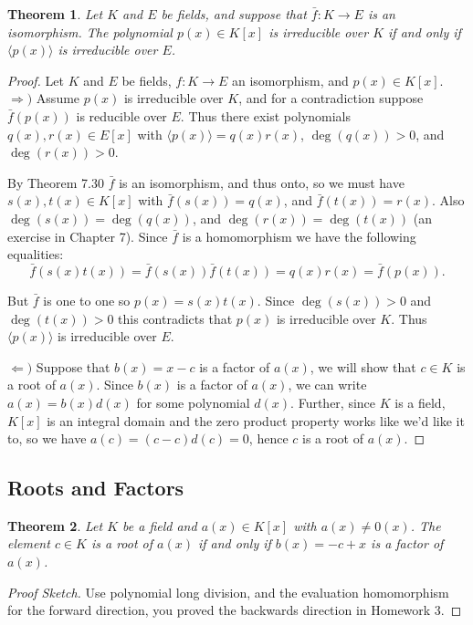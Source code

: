 \documentclass[letterpaper, 12pt]{article}
\newcommand{\pid}[1]{\langle #1 \rangle}
\newtheorem{thm}{Theorem}
\begin{document}
			\setcounter{thm}{13}
			\begin{thm}
			Let $K$ and $E$ be fields, and suppose that $\bar{f} : K \to E$ is an \textit{isomorphism}. 
			The polynomial $p(x) \in K[x]$ is irreducible over $K$ if and only if $\pid{p(x)}$ is irreducible over $E$.
			\end{thm}
			\color{ForestGreen}
			\begin{proof}
			Let $K$ and $E$ be fields, $f : K \to E$ an isomorphism, and $p(x) \in K[x]$.
			$\Rightarrow)$ Assume $p(x)$ is irreducible over $K$, and for a contradiction suppose $\bar{f}(p(x))$ is reducible over $E$. 
			Thus there exist polynomials $q(x),r(x) \in E[x]$ with $\pid{p(x)} = q(x)r(x)$, $\deg(q(x)) > 0$, and $\deg(r(x)) > 0$.

			By Theorem 7.30 $\bar{f}$ is an isomorphism, and thus onto, so we must have $s(x), t(x) \in K[x]$ with $\bar{f}(s(x)) = q(x)$, and $\bar{f}(t(x)) = r(x)$. 
			Also $\deg(s(x)) = \deg(q(x))$, and $\deg(r(x)) = \deg(t(x))$ (an exercise in Chapter 7). 
			Since $\bar{f}$ is a homomorphism we have the following equalities:$$\bar{f}(s(x)t(x)) = \bar{f}(s(x))\bar{f}(t(x)) = q(x)r(x) = \bar{f}(p(x)).$$

			But $\bar{f}$ is one to one so $p(x) = s(x)t(x)$. 
			Since $\deg(s(x)) > 0$ and $\deg(t(x)) > 0$ this contradicts that $p(x)$ is irreducible over $K$. Thus $\pid{p(x)}$ is irreducible over $E$.

			\color{blue}
			$\Leftarrow)$ Suppose that $b(x) = x - c$ is a factor of $a(x)$, we will show that $c \in K$ is a root of $a(x)$.
			Since $b(x)$ is a factor of $a(x)$, we can write $a(x) = b(x)d(x)$ for some polynomial $d(x)$.
			Further, since $K$ is a field, $K[x]$ is an integral domain and the zero product property works like we'd like it to, so we have $a(c) = (c - c)d(c) = 0$, hence $c$ is a root of $a(x)$.
			\end{proof}
			\color{black}

		\subsection{Roots and Factors}
		\label{sec:roots_and_factors}
			\begin{thm}
			Let $K$ be a field and $a(x) \in K[x]$ with $a(x) \neq 0(x)$. 
			The element $c \in K$ is a root of $a(x)$ if and only if $b(x) = -c + x$ is a factor of $a(x)$.
			\end{thm}
			\color{blue}
			\begin{proof}[Proof Sketch]
			Use polynomial long division, and the evaluation homomorphism for the forward direction, you proved the backwards direction in Homework 3.
			\end{proof}
			\color{black}
\end{document}
